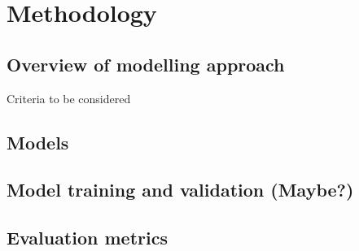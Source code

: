 \section{Methodology}
\subsection{Overview of modelling approach}
Criteria to be considered

\subsection{Models}

\subsection{Model training and validation (Maybe?)}

\subsection{Evaluation metrics}
